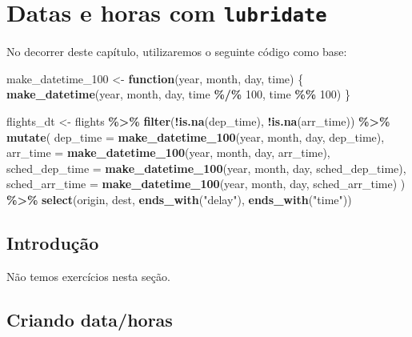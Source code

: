 \documentclass[
]{latex/krantz}
\newenvironment{Shaded}{\begin{snugshade}}{\end{snugshade}}
\newcommand{\AttributeTok}[1]{\textcolor[rgb]{0.13,0.29,0.53}{#1}}
\newcommand{\ControlFlowTok}[1]{\textcolor[rgb]{0.13,0.29,0.53}{\textbf{#1}}}
\newcommand{\DecValTok}[1]{\textcolor[rgb]{0.00,0.00,0.81}{#1}}
\newcommand{\FunctionTok}[1]{\textcolor[rgb]{0.13,0.29,0.53}{\textbf{#1}}}
\newcommand{\NormalTok}[1]{#1}
\newcommand{\OtherTok}[1]{\textcolor[rgb]{0.56,0.35,0.01}{#1}}
\newcommand{\SpecialCharTok}[1]{\textcolor[rgb]{0.81,0.36,0.00}{\textbf{#1}}}
\newcommand{\StringTok}[1]{\textcolor[rgb]{0.31,0.60,0.02}{#1}}
\theoremstyle{definition}
\theoremstyle{definition}
\theoremstyle{definition}
\theoremstyle{definition}
\theoremstyle{remark}
\begin{document}
\hypertarget{datas-e-horas-com-lubridate}{%
\chapter{\texorpdfstring{Datas e horas com \texttt{lubridate}}{Datas e horas com lubridate}}\label{datas-e-horas-com-lubridate}}

No decorrer deste capítulo, utilizaremos o seguinte código como base:

\begin{Shaded}
\begin{Highlighting}[]
\NormalTok{make\_datetime\_100 }\OtherTok{\textless{}{-}} \ControlFlowTok{function}\NormalTok{(year, month, day, time) \{}
  \FunctionTok{make\_datetime}\NormalTok{(year, month, day, time }\SpecialCharTok{\%/\%} \DecValTok{100}\NormalTok{, time }\SpecialCharTok{\%\%} \DecValTok{100}\NormalTok{)}
\NormalTok{\}}

\NormalTok{flights\_dt }\OtherTok{\textless{}{-}}\NormalTok{ flights }\SpecialCharTok{\%\textgreater{}\%}
  \FunctionTok{filter}\NormalTok{(}\SpecialCharTok{!}\FunctionTok{is.na}\NormalTok{(dep\_time), }\SpecialCharTok{!}\FunctionTok{is.na}\NormalTok{(arr\_time)) }\SpecialCharTok{\%\textgreater{}\%}
  \FunctionTok{mutate}\NormalTok{(}
    \AttributeTok{dep\_time =} \FunctionTok{make\_datetime\_100}\NormalTok{(year, month, day, dep\_time),}
    \AttributeTok{arr\_time =} \FunctionTok{make\_datetime\_100}\NormalTok{(year, month, day, arr\_time),}
    \AttributeTok{sched\_dep\_time =} \FunctionTok{make\_datetime\_100}\NormalTok{(year, month, day, sched\_dep\_time),}
    \AttributeTok{sched\_arr\_time =} \FunctionTok{make\_datetime\_100}\NormalTok{(year, month, day, sched\_arr\_time)}
\NormalTok{  ) }\SpecialCharTok{\%\textgreater{}\%}
  \FunctionTok{select}\NormalTok{(origin, dest, }\FunctionTok{ends\_with}\NormalTok{(}\StringTok{"delay"}\NormalTok{), }\FunctionTok{ends\_with}\NormalTok{(}\StringTok{"time"}\NormalTok{))}
\end{Highlighting}
\end{Shaded}

\hypertarget{introduuxe7uxe3o-9}{%
\section{Introdução}\label{introduuxe7uxe3o-9}}

Não temos exercícios nesta seção.

\hypertarget{criando-datahoras}{%
\section{Criando data/horas}\label{criando-datahoras}}
\end{document}
